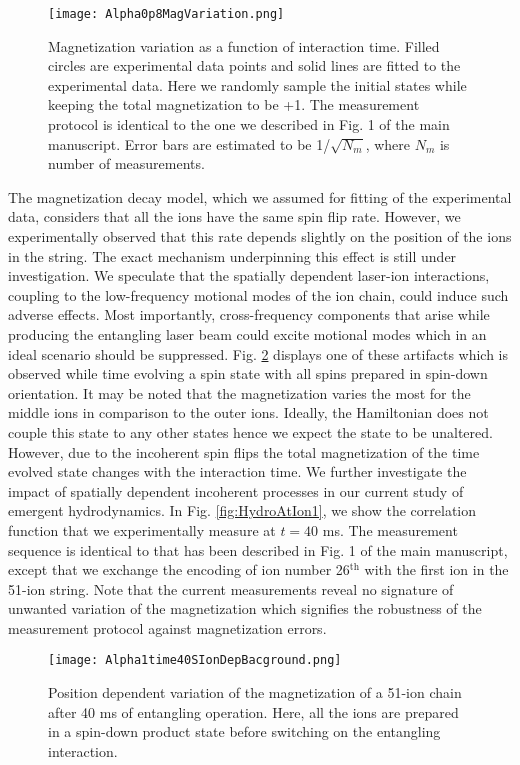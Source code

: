 \documentclass[aps,10pt,reprint,groupedaddress,superscriptaddress]{revtex4-2}
\begin{document}
\begin{figure}
\centering
\texttt{[image: Alpha0p8MagVariation.png]}
\caption{Magnetization variation as a function of interaction time. Filled circles are experimental data points and solid lines are fitted to the experimental data. Here we randomly sample the initial states while keeping the total magnetization to be +1. The measurement protocol is identical to the one we described in Fig. 1 of the main manuscript. Error bars are estimated to be 1/$\sqrt{N_m}$, where $N_m$ is number of measurements.} \label{fig:MagVar}
\end{figure}


The magnetization decay model, which we assumed for fitting of the experimental data, considers that all the ions have the same spin flip rate. However, we experimentally observed that this rate depends slightly on the position of the ions in the string. The exact mechanism underpinning this effect is still under investigation. We speculate that the spatially dependent laser-ion interactions, coupling to the low-frequency motional modes of the ion chain, could induce such adverse effects. Most importantly, cross-frequency components that arise while producing the entangling laser beam could excite motional modes which in an ideal scenario should be suppressed. Fig. \ref{fig:MagVariaionSpatially} displays one of these artifacts which is observed while time evolving a spin state with all spins prepared in spin-down orientation. It may be noted that the magnetization varies the most for the middle ions in comparison to the outer ions. Ideally, the Hamiltonian does not couple this state to any other states hence we expect the state to be unaltered. However, due to the incoherent spin flips the total magnetization of the time evolved state changes with the interaction time. We further investigate the impact of spatially dependent incoherent processes in our current study of emergent hydrodynamics. In Fig. \ref{fig:HydroAtIon1}, we show the correlation function that we experimentally measure at $t=40$ ms. The measurement sequence is identical to that has been described in Fig. 1 of the main manuscript, except that we exchange the encoding of ion number 26$^{\text{th}}$ with the first ion in the 51-ion string. Note that the current measurements reveal no signature of unwanted variation of the magnetization which signifies the robustness of the measurement protocol against magnetization errors. 


\begin{figure}
\centering
\texttt{[image: Alpha1time40SIonDepBacground.png]}
\caption{Position dependent variation of the magnetization of a 51-ion chain after 40 ms of entangling operation. Here, all the ions are prepared in a spin-down product state before switching on the entangling interaction. } \label{fig:MagVariaionSpatially}
\end{figure}
\end{document}
